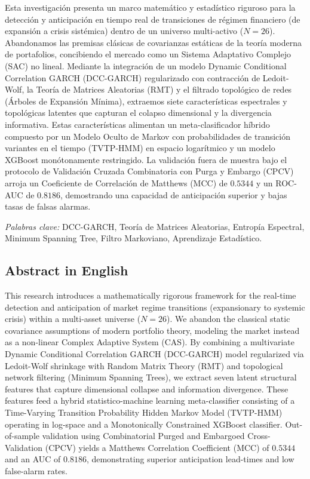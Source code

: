 \documentclass[
  12pt,
]{article}
\begin{document}
Esta investigación presenta un marco matemático y estadístico riguroso
para la detección y anticipación en tiempo real de transiciones de
régimen financiero (de expansión a crisis sistémica) dentro de un
universo multi-activo (\(N=26\)). Abandonamos las premisas clásicas de
covarianzas estáticas de la teoría moderna de portafolios, concibiendo
el mercado como un Sistema Adaptativo Complejo (SAC) no lineal. Mediante
la integración de un modelo Dynamic Conditional Correlation GARCH
(DCC-GARCH) regularizado con contracción de Ledoit-Wolf, la Teoría de
Matrices Aleatorias (RMT) y el filtrado topológico de redes (Árboles de
Expansión Mínima), extraemos siete características espectrales y
topológicas latentes que capturan el colapso dimensional y la
divergencia informativa. Estas características alimentan un
meta-clasificador híbrido compuesto por un Modelo Oculto de Markov con
probabilidades de transición variantes en el tiempo (TVTP-HMM) en
espacio logarítmico y un modelo XGBoost monótonamente restringido. La
validación fuera de muestra bajo el protocolo de Validación Cruzada
Combinatoria con Purga y Embargo (CPCV) arroja un Coeficiente de
Correlación de Matthews (MCC) de \(0.5344\) y un ROC-AUC de \(0.8186\),
demostrando una capacidad de anticipación superior y bajas tasas de
falsas alarmas.

\emph{Palabras clave:} DCC-GARCH, Teoría de Matrices Aleatorias,
Entropía Espectral, Minimum Spanning Tree, Filtro Markoviano,
Aprendizaje Estadístico.

\subsection{Abstract in English}\label{abstract-in-english}

This research introduces a mathematically rigorous framework for the
real-time detection and anticipation of market regime transitions
(expansionary to systemic crisis) within a multi-asset universe
(\(N=26\)). We abandon the classical static covariance assumptions of
modern portfolio theory, modeling the market instead as a non-linear
Complex Adaptive System (CAS). By combining a multivariate Dynamic
Conditional Correlation GARCH (DCC-GARCH) model regularized via
Ledoit-Wolf shrinkage with Random Matrix Theory (RMT) and topological
network filtering (Minimum Spanning Trees), we extract seven latent
structural features that capture dimensional collapse and information
divergence. These features feed a hybrid statistico-machine learning
meta-classifier consisting of a Time-Varying Transition Probability
Hidden Markov Model (TVTP-HMM) operating in log-space and a
Monotonically Constrained XGBoost classifier. Out-of-sample validation
using Combinatorial Purged and Embargoed Cross-Validation (CPCV) yields
a Matthews Correlation Coefficient (MCC) of \(0.5344\) and an AUC of
\(0.8186\), demonstrating superior anticipation lead-times and low
false-alarm rates.
\end{document}
